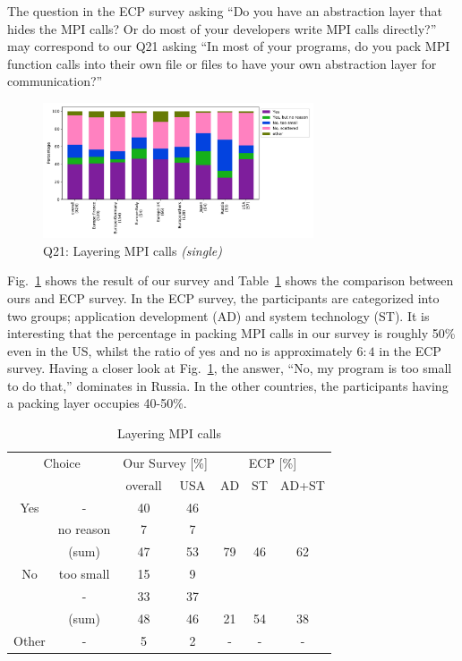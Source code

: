 \documentclass[conference,10pt,letterpaper]{IEEEtran}
\begin{document}
The question in the ECP survey asking ``Do you have an abstraction
layer that hides the MPI calls? Or do most of your developers write
MPI calls directly?'' may correspond to our Q21 asking ``In most of
your programs, do you pack MPI function calls into their own file or
files to have your own abstraction layer for communication?'' 

\begin{figure}[htb]
\begin{center}
\includegraphics[width=8cm]{Figs/Q21.pdf}
\caption{Q21: Layering MPI calls {\it(single)}}
\label{fig:layering-mpi-calls}
\end{center}
\end{figure}

Fig.~\ref{fig:layering-mpi-calls} shows the result of our survey and
Table~\ref{tab:layering-mpi-calls} shows the comparison between ours
and ECP survey. In the ECP survey, the participants are categorized
into two groups; application development (AD) and system technology
(ST). It is interesting that the percentage in packing MPI calls
in our survey is roughly 50\% even in the US, whilst the ratio of yes
and no is approximately $6:4$ in the ECP survey.
Having a closer look at Fig.~\ref{fig:layering-mpi-calls}, the answer,
 ``No, my program is too small to do that,'' dominates in Russia. In
the other countries, the participants having a packing layer occupies
40-50\%. 

\begin{table}[htb]%
\begin{center}%
\caption{Layering MPI calls}\label{tab:layering-mpi-calls}%
\begin{tabular}{c|c||c|c||c|c|c}%
\hline%
\multicolumn{2}{c||}{Choice} & \multicolumn{2}{c||}{Our Survey [\%]} &
\multicolumn{3}{c}{ECP [\%]} \\
\cline{3-7}%
\multicolumn{2}{c||}{} & overall & USA & AD & ST & AD+ST \\
\hline%
\hline%
Yes & - & 40 & 46 & & & \\
& no reason & 7 & 7 & & & \\
\cline{2-4}%
 & (sum) & 47 & 53 &  79 & 46 & 62 \\
\hline%
\hline%
No & too small & 15 & 9 & & & \\
& - & 33 & 37 & & & \\
\cline{2-4}%
 & (sum) & 48 & 46 & 21 & 54 & 38 \\
\hline%
Other & - & 5 & 2 & - & - & - \\
\hline%
\end{tabular}%
\end{center}%
\end{table}%
\end{document}
